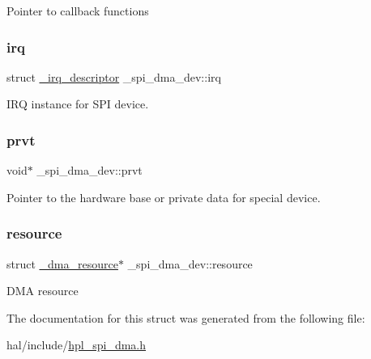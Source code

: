 Pointer to callback functions \mbox{\label{struct__spi__dma__dev_a1f0425472993f98835f532b416c94a78}} 
\subsubsection{\texorpdfstring{irq}{irq}}
{\footnotesize\ttfamily struct \hyperlink{struct__irq__descriptor}{\+\_\+irq\+\_\+descriptor} \+\_\+spi\+\_\+dma\+\_\+dev\+::irq}

I\+RQ instance for S\+PI device. \mbox{\label{struct__spi__dma__dev_a79d51491e26afd692bd0dd65c8db74fc}} 
\subsubsection{\texorpdfstring{prvt}{prvt}}
{\footnotesize\ttfamily void$\ast$ \+\_\+spi\+\_\+dma\+\_\+dev\+::prvt}

Pointer to the hardware base or private data for special device. \mbox{\label{struct__spi__dma__dev_ab42c62f8953608163ed836688813697d}} 
\subsubsection{\texorpdfstring{resource}{resource}}
{\footnotesize\ttfamily struct \hyperlink{struct__dma__resource}{\+\_\+dma\+\_\+resource}$\ast$ \+\_\+spi\+\_\+dma\+\_\+dev\+::resource}

D\+MA resource 

The documentation for this struct was generated from the following file\+:\begin{DoxyCompactItemize}
\item 
hal/include/\hyperlink{hpl__spi__dma_8h}{hpl\+\_\+spi\+\_\+dma.\+h}\end{DoxyCompactItemize}
